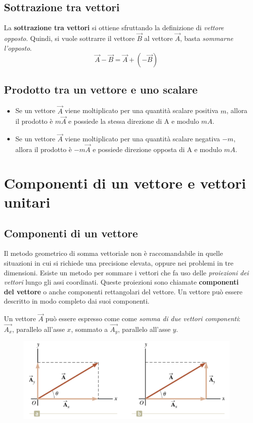\documentclass[12pt,oneside]{book}
\begin{document}
\subsection{Sottrazione tra vettori}
La \textbf{sottrazione tra vettori} si ottiene sfruttando la definizione di \emph{vettore opposto}.
Quindi, si vuole sottrarre il vettore $\vec{B}$ al vettore $\vec{A}$, basta \emph{sommarne l'opposto}.
\begin{equation*}
    \vec{A} - \vec{B} = \vec{A} + (- \vec{B})
\end{equation*}

\subsection{Prodotto tra un vettore e uno scalare}
\begin{itemize}
    \item Se un vettore $\vec{A}$ viene moltiplicato per una quantità scalare positiva $m$,
          allora il prodotto è $m\vec{A}$ e possiede la stessa direzione di A e modulo $mA$.
    \item Se un vettore $\vec{A}$ viene moltiplicato per una quantità scalare negativa $-m$,
          allora il prodotto è $-m\vec{A}$ e possiede direzione opposta di A e modulo $mA$.
\end{itemize}

\newpage
\section{Componenti di un vettore e vettori unitari}
\subsection{Componenti di un vettore}
Il metodo geometrico di somma vettoriale non è raccomandabile in quelle situazioni in cui si richiede una precisione elevata, oppure nei problemi in tre dimensioni.
Esiste un metodo per sommare i vettori che fa uso delle \emph{proiezioni dei vettori} lungo gli assi coordinati.
Queste proiezioni sono chiamate \textbf{componenti del vettore} o anche componenti rettangolari del vettore. Un vettore può essere descritto in modo completo dai suoi componenti.

Un vettore $\vec{A}$ può essere espresso come come \emph{somma di due vettori componenti}: $\vec{A_x}$, parallelo all'asse $x$, sommato a $\vec{A_y}$,
parallelo all'asse $y$.
\begin{figure}[h]
    \includegraphics[scale=0.5]{vettori_componenti}
    \centering
\end{figure}
\end{document}
